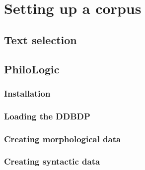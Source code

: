 \chapter{Setting up a corpus}
\label{chp:setup}
\minitoc\mtcskip
\section{Text selection}
\label{sect:textselection}
\section{PhiloLogic}
\label{sect:philologictools}
\subsection{Installation}
\label{subsect:installation}
\subsection{Loading the DDBDP}
\label{subsect:loadingddbdp}
\subsection{Creating morphological data}
\label{subsect:morphdata}
\subsection{Creating syntactic data}
\label{subsect:syntacticdata}
